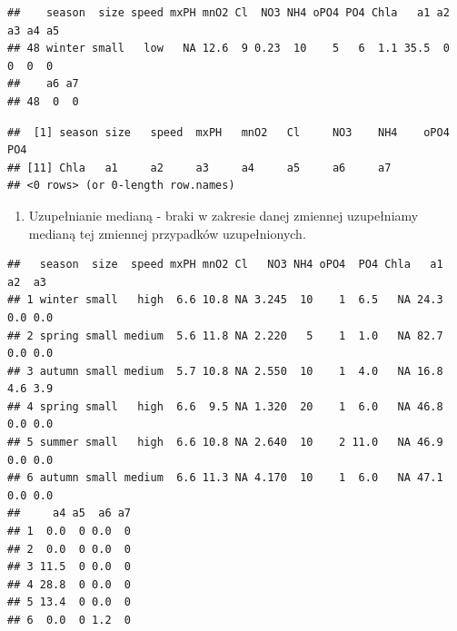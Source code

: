 \documentclass[]{book}
\newenvironment{Shaded}{\begin{snugshade}}{\end{snugshade}}
\newcommand{\DataTypeTok}[1]{\textcolor[rgb]{0.13,0.29,0.53}{#1}}
\newcommand{\KeywordTok}[1]{\textcolor[rgb]{0.13,0.29,0.53}{\textbf{#1}}}
\newcommand{\NormalTok}[1]{#1}
\newcommand{\OperatorTok}[1]{\textcolor[rgb]{0.81,0.36,0.00}{\textbf{#1}}}
\newcommand{\StringTok}[1]{\textcolor[rgb]{0.31,0.60,0.02}{#1}}
\providecommand{\tightlist}{%
  \setlength{\itemsep}{0pt}\setlength{\parskip}{0pt}}
\theoremstyle{plain}
\theoremstyle{definition}
\begin{document}
\begin{Shaded}
\end{Shaded}

\begin{verbatim}
##    season  size speed mxPH mnO2 Cl  NO3 NH4 oPO4 PO4 Chla   a1 a2 a3 a4 a5
## 48 winter small   low   NA 12.6  9 0.23  10    5   6  1.1 35.5  0  0  0  0
##    a6 a7
## 48  0  0
\end{verbatim}

\begin{Shaded}
\end{Shaded}

\begin{verbatim}
##  [1] season size   speed  mxPH   mnO2   Cl     NO3    NH4    oPO4   PO4   
## [11] Chla   a1     a2     a3     a4     a5     a6     a7    
## <0 rows> (or 0-length row.names)
\end{verbatim}

\begin{enumerate}
\def\labelenumi{\arabic{enumi}.}
\setcounter{enumi}{1}
\tightlist
\item
  Uzupełnianie medianą - braki w zakresie danej zmiennej uzupełniamy medianą tej zmiennej przypadków uzupełnionych.
\end{enumerate}

\begin{Shaded}
\end{Shaded}

\begin{verbatim}
##   season  size  speed mxPH mnO2 Cl   NO3 NH4 oPO4  PO4 Chla   a1  a2  a3
## 1 winter small   high  6.6 10.8 NA 3.245  10    1  6.5   NA 24.3 0.0 0.0
## 2 spring small medium  5.6 11.8 NA 2.220   5    1  1.0   NA 82.7 0.0 0.0
## 3 autumn small medium  5.7 10.8 NA 2.550  10    1  4.0   NA 16.8 4.6 3.9
## 4 spring small   high  6.6  9.5 NA 1.320  20    1  6.0   NA 46.8 0.0 0.0
## 5 summer small   high  6.6 10.8 NA 2.640  10    2 11.0   NA 46.9 0.0 0.0
## 6 autumn small medium  6.6 11.3 NA 4.170  10    1  6.0   NA 47.1 0.0 0.0
##     a4 a5  a6 a7
## 1  0.0  0 0.0  0
## 2  0.0  0 0.0  0
## 3 11.5  0 0.0  0
## 4 28.8  0 0.0  0
## 5 13.4  0 0.0  0
## 6  0.0  0 1.2  0
\end{verbatim}
\end{document}
